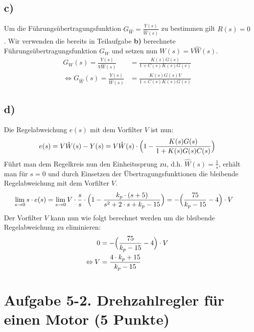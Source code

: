 \documentclass[11pt]{scrartcl} %
\begin{document}
\subsection*{c)}
Um die Führungsübertragungsfunktion $G_{\hat{W}}=\frac{Y(s)}{\hat{W}(s)}$ zu bestimmen gilt $R(s)=0$. Wir verwenden die bereits in Teilaufgabe \textbf{b)} berechnete Führungsübertragungsfunktion $G_W$ und setzen nun $W(s)=V\hat{W}(s)$.
\begin{align*}
	G_{W}(s)=\frac{Y(s)}{V\hat{W}(s)}&=\frac{K(s)G(s)}{1+C(s)K(s)G(s)}\\
	\Leftrightarrow G_{\hat{W}}(s)=\frac{Y(s)}{\hat{W}(s)}&=\frac{K(s)G(s)V}{1+C(s)K(s)G(s)}
\end{align*}
\subsection*{d)}
Die Regelabweichung $e(s)$ mit dem Vorfilter $V$ ist nun:
\begin{align*}
	e(s)=V\hat{W}(s)-Y(s)=V\hat{W}(s)\cdot\Bigl(1-\frac{K(s)G(s)}{1+K(s)G(s)C(s)}\Bigl)
\end{align*}
Führt man dem Regelkreis nun den Einheitssprung zu, d.h. $\hat{W}(s)=\frac{1}{s}$, erhält man für $s=0$ und durch Einsetzen der Übertragungsfunktionen die bleibende Regelabweichung mit dem Vorfilter $V$.
\begin{align*}
	\lim \limits_{s \to 0}s\cdot e(s)&=\lim \limits_{s \to 0}V\cdot\frac{s}{s}\cdot\Bigl(1-\frac{k_p\cdot(s+5)}{s^2+2\cdot s+k_p-15}\Bigr)=-\Bigl(\frac{75}{k_p-15}-4\Bigr)\cdot V
\end{align*}
Der Vorfilter $V$ kann nun wie folgt berechnet werden um die bleibende Regelabweichung zu eliminieren:
\begin{align*}
	0&=-\Bigl(\frac{75}{k_p-15}-4\Bigr)\cdot V\\
\Leftrightarrow V&=\frac{4\cdot k_p+15}{k_p-15}
\end{align*}

\section*{Aufgabe 5-2. Drehzahlregler für einen Motor (5 Punkte)}
\end{document}
